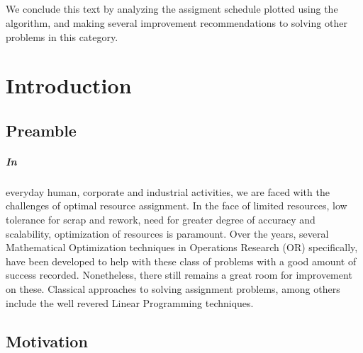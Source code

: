 \documentclass[a4paper,openany]{book}
\begin{document}
		\paragraph{}
		We conclude this text by analyzing the assigment schedule plotted using the algorithm, and making several improvement recommendations to solving other problems in this category.
		
	\setcounter{tocdepth}{1}
	\tableofcontents
	\listoftables
	\mainmatter
    \chapter{Introduction}
        \section{Preamble}
        \paragraph{In}
			everyday human, corporate and industrial activities, we are faced with the challenges of optimal resource assignment. In the face of limited resources, low tolerance for scrap and rework, need for greater degree of accuracy and scalability, optimization of resources is paramount.
            Over the years, several Mathematical Optimization techniques in Operations Research (OR) specifically, have been developed to help with these class of problems with a good amount of success recorded. Nonetheless, there still remains a great room for improvement on these. Classical approaches to solving assignment problems, among others include the well revered Linear Programming techniques.
		\section{Motivation}
\end{document}
